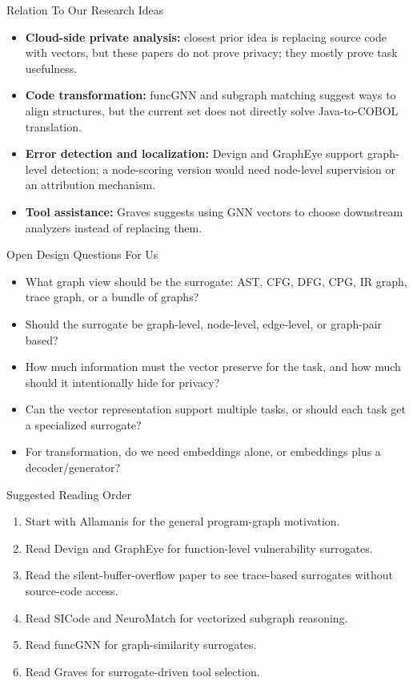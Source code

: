 \documentclass[10pt]{beamer}
\begin{document}
\begin{frame}{Relation To Our Research Ideas}
  \begin{itemize}
    \item \textbf{Cloud-side private analysis:} closest prior idea is replacing source code with vectors, but these papers do not prove privacy; they mostly prove task usefulness.
    \item \textbf{Code transformation:} funcGNN and subgraph matching suggest ways to align structures, but the current set does not directly solve Java-to-COBOL translation.
    \item \textbf{Error detection and localization:} Devign and GraphEye support graph-level detection; a node-scoring version would need node-level supervision or an attribution mechanism.
    \item \textbf{Tool assistance:} Graves suggests using GNN vectors to choose downstream analyzers instead of replacing them.
  \end{itemize}
\end{frame}

\begin{frame}{Open Design Questions For Us}
  \begin{itemize}
    \item What graph view should be the surrogate: AST, CFG, DFG, CPG, IR graph, trace graph, or a bundle of graphs?
    \item Should the surrogate be graph-level, node-level, edge-level, or graph-pair based?
    \item How much information must the vector preserve for the task, and how much should it intentionally hide for privacy?
    \item Can the vector representation support multiple tasks, or should each task get a specialized surrogate?
    \item For transformation, do we need embeddings alone, or embeddings plus a decoder/generator?
  \end{itemize}
\end{frame}

\begin{frame}{Suggested Reading Order}
  \begin{enumerate}
    \item Start with Allamanis for the general program-graph motivation.
    \item Read Devign and GraphEye for function-level vulnerability surrogates.
    \item Read the silent-buffer-overflow paper to see trace-based surrogates without source-code access.
    \item Read SICode and NeuroMatch for vectorized subgraph reasoning.
    \item Read funcGNN for graph-similarity surrogates.
    \item Read Graves for surrogate-driven tool selection.
  \end{enumerate}
\end{frame}
\end{document}
